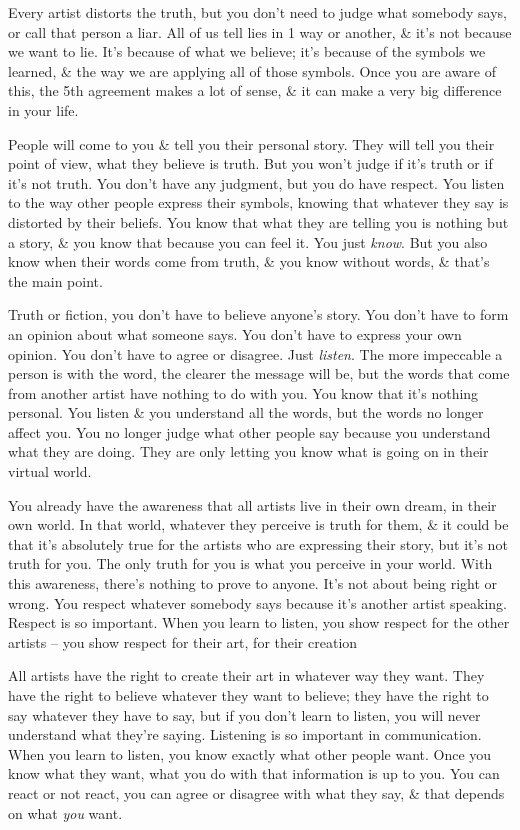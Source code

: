 \documentclass{article}
\numberwithin{equation}{section}
\begin{document}
Every artist distorts the truth, but you don't need to judge what somebody says, or call that person a liar. All of us tell lies in 1 way or another, \& it's not because we want to lie. It's because of what we believe; it's because of the symbols we learned, \& the way we are applying all of those symbols. Once you are aware of this, the 5th agreement makes a lot of sense, \& it can make a very big difference in your life.

People will come to you \& tell you their personal story. They will tell you their point of view, what they believe is truth. But you won't judge if it's truth or if it's not truth. You don't have any judgment, but you do have respect. You listen to the way other people express their symbols, knowing that whatever they say is distorted by their beliefs. You know that what they are telling you is nothing but a story, \& you know that because you can feel it. You just \textit{know}. But you also know when their words come from truth, \& you know without words, \& that's the main point.

Truth or fiction, you don't have to believe anyone's story. You don't have to form an opinion about what someone says. You don't have to express your own opinion. You don't have to agree or disagree. Just \textit{listen}. The more impeccable a person is with the word, the clearer the message will be, but the words that come from another artist have nothing to do with you. You know that it's nothing personal. You listen \& you understand all the words, but the words no longer affect you. You no longer judge what other people say because you understand what they are doing. They are only letting you know what is going on in their virtual world.

You already have the awareness that all artists live in their own dream, in their own world. In that world, whatever they perceive is truth for them, \& it could be that it's absolutely true for the artists who are expressing their story, but it's not truth for you. The only truth for you is what you perceive in your world. With this awareness, there's nothing to prove to anyone. It's not about being right or wrong. You respect whatever somebody says because it's another artist speaking. Respect is so important. When you learn to listen, you show respect for the other artists -- you show respect for their art, for their creation

All artists have the right to create their art in whatever way they want. They have the right to believe whatever they want to believe; they have the right to say whatever they have to say, but if you don't learn to listen, you will never understand what they're saying. Listening is so important in communication. When you learn to listen, you know exactly what other people want. Once you know what they want, what you do with that information is up to you. You can react or not react, you can agree or disagree with what they say, \& that depends on what \textit{you} want.
\end{document}
